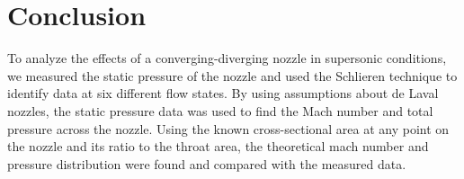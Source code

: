 \chapter{Conclusion}
\label{cp:conclusion}
To analyze the effects of a converging-diverging nozzle in supersonic conditions, we measured the static pressure of the nozzle and used the Schlieren technique to identify data at six different flow states. By using assumptions about de Laval nozzles, the static pressure data was used to find the Mach number and total pressure across the nozzle. Using the known cross-sectional area at any point on the nozzle and its ratio to the throat area, the theoretical mach number and pressure distribution were found and compared with the measured data.